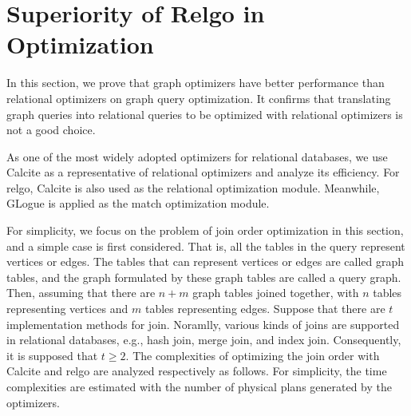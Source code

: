 \section{Superiority of Relgo in Optimization}
\label{sec:theoretical-analysis}

In this section, we prove that graph optimizers have better performance than relational optimizers on graph query optimization.
It confirms that translating graph queries into relational queries to be optimized with relational optimizers is not a good choice.

As one of the most widely adopted optimizers for relational databases, we use Calcite \cite{calcite,columbia} as a representative of relational optimizers and analyze its efficiency.
For relgo, Calcite is also used as the relational optimization module.
Meanwhile, GLogue \cite{GLogS} is applied as the match optimization module.

For simplicity, we focus on the problem of join order optimization in this section, and a simple case is first considered.
That is, all the tables in the query represent vertices or edges.
The tables that can represent vertices or edges are called graph tables, and the graph formulated by these graph tables are called a query graph.
Then, assuming that there are $n + m$ graph tables joined together, with $n$ tables representing vertices and $m$ tables representing edges.
Suppose that there are $t$ implementation methods for join.
Noramlly, various kinds of joins are supported in relational databases, e.g., hash join, merge join, and index join.
Consequently, it is supposed that $t \geq 2$.
The complexities of optimizing the join order with Calcite and relgo are analyzed respectively as follows.
For simplicity, the time complexities are estimated with the number of physical plans generated by the optimizers.


